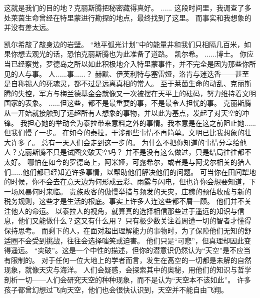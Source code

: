 \documentclass[openany]{book}
\begin{document}
\begin{dialogue}
     这就是我们的目的地？克丽斯腾把秘密藏得真好。
     ......
     这段时间里，我调查了多处莱茵生命曾经在特里蒙进行勘探的地点，最终找到了这里。
     而事实和我想象的并没有差太远。\par
    凯尔希敲了敲身边的岩壁。
     “地平弧光计划”中的能量井和我们只相隔几百米，如果你想去观光的话，恐怕克丽斯腾也为此准备了道路。
     凯尔希。
     ......博士。
     你应当已经察觉，罗德岛之所以如此积极地介入特里蒙事件，并不完全是因为那些你所见的人与事。
     人......事......？
     赫默、伊芙利特与塞雷娅，洛肯与迷迭香——甚至是自称锡人的死魂灵，都不过是远离真相的常人。
     至于莱茵生命的动乱、克丽斯腾的失控，军方与梅兰德基金会就像又一次被摆在天平上的砝码，努力维持着文明国家的表象。
     ......但这些，都不是最重要的事，不是最令人担忧的事。
     克丽斯腾从一开始就接触到了远超所有人想象的事物，并以此为基点，发起了对天空的冲锋。
     我担心她的举动会为泰拉带来意料之外的事情。我本意是在这之前阻止她......但我们慢了一步。
     在如今的泰拉，干涉那些事情不再简单。文明已比我想象的壮大许多了。
     总有一天人们会走到这一步的。
     为什么不把你知道的事情分享给他人？克丽斯腾不只是试图突破天空吗？
     并不是没有这么做过，只是结局往往都不太好。
     哪怕在如今的罗德岛上，阿米娅，可露希尔，或者是与阿戈尔相关的猎人们......他们都已经知道许多事情，以帮助他们解决他们的问题。
     可当你在田间犁地的时候，你不会去在意天边为何形成云彩、雨露与闪电，但也许你会想要知道，下一场风暴何时来临。
     贵族政客的傲慢举措与频发的天灾，庄稼的预估收成与新的税务规则，这些才是生活的根底。事实上许多人连这些都不屑一顾。
     他们并不关注他人的命运。
     以泰拉人的视角，就算真的选择相信那些过于遥远的知识与信息，他们又能做什么？这又有什么用？
     只有极少数关注着周遭一切的智者才懂得保持思考。
     而剩下的人，在面对超出理解能力的事物时，为了保障他们无知的舒适圈不会受到挑战，往往会选择嗤笑或迫害。
     他们只是“可悲”，但真理却因此变得遥远。
     “突破”。这是一个中性的描述，但你的潜意识仍然认为“天空”是不应当有限制的。
     对于任何一位大地上的学者而言，发生在高空的一切都是未解的自然现象，就像天灾与海洋。
     人们会疑惑，会探索其中的奥秘，用他们的知识与哲学剖析一切——人们会研究天空的种种现象，而不是认为“天空本不该如此”。
     许多孩子都曾幻想过飞向天空，他们也会很快认识到，天空并不能自由飞翔。

\end{dialogue}
\end{document}
